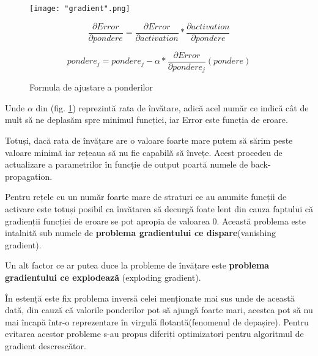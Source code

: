 \documentclass[a4paper, 12pt]{article}
\begin{document}
	\begin{figure}[!htb]
		\centering
		\begin{minipage}{0.3\textwidth}
			\texttt{[image: "gradient".png]}
		\end{minipage}%
		\hfill%
		\begin{minipage}{0.6\textwidth}\raggedleft
			\[
			\frac{\partial Error}{\partial pondere}	 = \frac{\partial Error}{\partial activation} * \frac{\partial activation}{\partial pondere}
			\]
			\par
			\[
			pondere_j = pondere_j - \alpha*\frac{\partial Error}{\partial pondere_j}(pondere)
			\]
		\end{minipage}
		\caption{Formula de ajustare a ponderilor}
		\label{fig:descent}
	\end{figure}
	
	Unde $\alpha$ din (fig. \ref{fig:descent}) reprezintă rata de învătare, adică acel număr ce indică cât de mult să ne deplasăm spre minimul funcției, iar Error este funcția de eroare. 
	
	Totuși, dacă rata de învățare are o valoare foarte mare putem să sărim peste valoare minimă iar rețeaua să nu fie capabilă să învețe. Acest procedeu de actualizare a parametrilor în funcție de output poartă numele de back-propagation.
	
	Pentru rețele cu un număr foarte mare de straturi ce au anumite funcții de activare este totuși posibil ca învătarea să decurgă foate lent din cauza faptului că gradienții funcției de eroare se pot apropia de valoarea 0.
	Această problema este intalnită sub numele de \textbf{problema gradientului ce dispare}(vanishing gradient).
	
	Un alt factor ce ar putea duce la probleme de învățare este \textbf{problema gradientului ce explodează} (exploding gradient).
	
	În estență este fix problema inversă celei menționate mai sus unde de această dată, din cauză că valorile ponderilor pot să ajungă foarte mari, acestea pot să nu mai încapă într-o reprezentare în virgulă flotantă(fenomenul de depașire).
	Pentru evitarea acestor probleme s-au propus diferiți optimizatori pentru algoritmul de gradient descrescător.
	
	\bigskip
\end{document}
